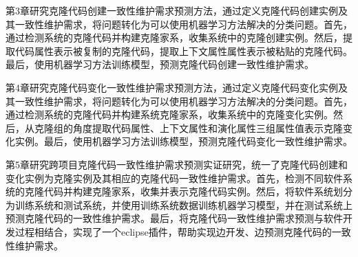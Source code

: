 第3章研究克隆代码创建一致性维护需求预测方法，通过定义克隆代码创建实例及其一致性维护需求，将问题转化为可以使用机器学习方法解决的分类问题。首先，通过检测系统的克隆代码并构建克隆家系，收集系统中的克隆创建实例。然后，提取代码属性表示被复制的克隆代码，提取上下文属性属性表示被粘贴的克隆代码。最后，使用机器学习方法训练模型，预测克隆代码创建一致性维护需求。

第4章研究克隆代码变化一致性维护需求预测方法，通过定义克隆代码变化实例及其一致性维护需求，将问题转化为可以使用机器学习方法解决的分类问题。首先，通过检测系统的克隆代码并构建系统克隆家系，收集系统中的克隆变化实例。然后，从克隆组的角度提取代码属性、上下文属性和演化属性三组属性值表示克隆变化实例。最后，使用机器学习方法训练模型，预测克隆代码变化一致性维护需求。

第5章研究跨项目克隆代码一致性维护需求预测实证研究，统一了克隆代码创建和变化实例为克隆实例及其相应的克隆代码一致性维护需求。首先，检测不同软件系统的克隆代码并构建克隆家系，收集并表示克隆代码实例。然后，将软件系统划分为训练系统和测试系统，并使用训练系统数据训练机器学习模型，并在测试系统上预测克隆代码的一致性维护需求。最后，将克隆代码一致性维护需求预测与软件开发过程相结合，实现了一个eclipse插件，帮助实现边开发、边预测克隆代码的一致性维护需求。

